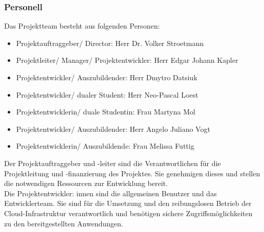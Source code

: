 \subsubsection{Personell}
\label{sec:Personell}
Das Projektteam besteht aus folgenden Personen:
\begin{itemize} [label=--]
	\item Projektauftraggeber/ Director: Herr Dr. Volker Stroetmann
	\item Projektleiter/ Manager/ Projektentwickler: Herr Edgar Johann Kapler
	\item Projektentwickler/ Auszubildender: Herr Dmytro Datsiuk
	\item Projektentwickler/ dualer Student: Herr Neo-Pascal Loest
	\item Projektentwicklerin/ duale Studentin: Frau Martyna Mol 
	\item Projektentwickler/ Auszubildender: Herr Angelo Juliano Vogt
	\item Projektentwicklerin/ Auszubildende: Frau Melissa Futtig
\end{itemize}
Der Projektauftraggeber und -leiter sind die Verantwortlichen für die Projektleitung und -finanzierung des Projektes. 
Sie genehmigen dieses und stellen die notwendigen Ressourcen zur Entwicklung bereit.
\\Die Projektentwickler: innen sind die allgemeinen Benutzer und das Entwicklerteam. Sie sind für die Umsetzung und den 
reibungslosen Betrieb der Cloud-Infrastruktur verantwortlich und benötigen sichere Zugriffsmöglichkeiten zu den 
bereitgestellten Anwendungen.